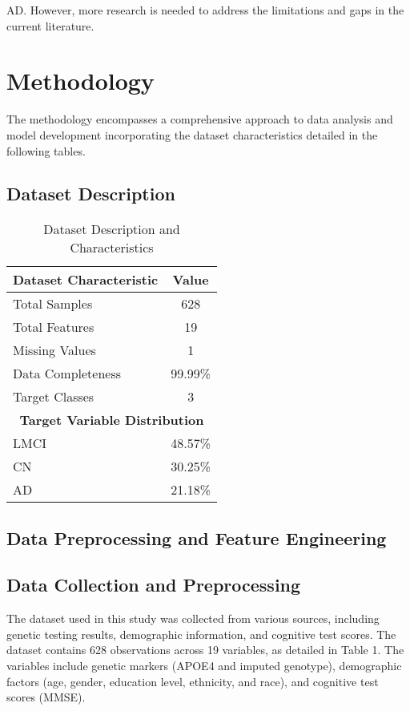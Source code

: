 \documentclass[conference]{IEEEtran}
\begin{document}
AD. However, more research is needed to address the limitations and gaps in the current literature.

\section{Methodology}
The methodology encompasses a comprehensive approach to data analysis and model development incorporating the dataset characteristics detailed in the following tables.

\subsection{Dataset Description}

\begin{table}[!h]
\centering
\caption{Dataset Description and Characteristics}
\label{tab:dataset_description}
\begin{tabular}{|l|c|}
\hline
\textbf{Dataset Characteristic} & \textbf{Value} \\
\hline
Total Samples & 628 \\
\hline
Total Features & 19 \\
\hline
Missing Values & 1 \\
\hline
Data Completeness & 99.99\% \\
\hline
Target Classes & 3 \\
\hline
\hline
\multicolumn{2}{|c|}{\textbf{Target Variable Distribution}} \\
\hline
LMCI & 48.57\% \\
\hline
CN & 30.25\% \\
\hline
AD & 21.18\% \\
\hline
\end{tabular}
\end{table}



\subsection{Data Preprocessing and Feature Engineering}
\subsection{Data Collection and Preprocessing}
The dataset used in this study was collected from various sources, including genetic testing results, demographic information, and cognitive test scores. The dataset contains 628 observations across 19 variables, as detailed in Table 1. The variables include genetic markers (APOE4 and imputed genotype), demographic factors (age, gender, education level, ethnicity, and race), and cognitive test scores (MMSE).
\end{document}
